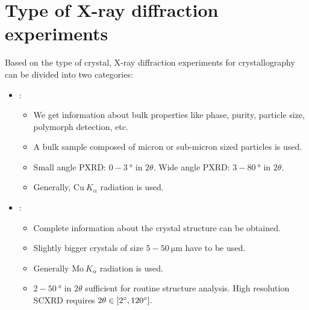 \section{Type of X-ray diffraction experiments}

Based on the type of crystal, X-ray diffraction experiments for crystallography can be divided into two categories:%
%	
	\begin{itemize}%
%	
	    \item {}:%
%	    	
	    	\begin{itemize}[label={$\rightarrowtail$}]%
%	    	
	    	    \item We get information about bulk properties like phase, purity, particle size, polymorph detection, etc.
	    	    
	    	    \item A bulk sample composed of micron or sub-micron sized particles is used.
	    	    
	    	    \item Small angle PXRD: $0-3~\si{\degree}$ in $2\theta.$ Wide angle PXRD: $3-80~\si{\degree}$ in $2\theta.$
	    	    
	    	    \item Generally, $\mathrm{Cu}~K_\alpha$ radiation is used.
	    	    
	    	\end{itemize}
	    	
	    \item {}:%
%	    	
	    	\begin{itemize}[label={$\rightarrowtail$}]%
%	    	
	    	    \item Complete information about the crystal structure can be obtained.
	    	    
	    	    \item Slightly bigger crystals of size $5-50~\si{\micro\metre}$ have to be used.
	    	    
	    	    \item Generally $\mathrm{Mo}~K_\alpha$ radiation is used.
	    	    
	    	    \item $2-50~\si{\degree}$ in $2\theta$ sufficient for routine structure analysis. High resolution SCXRD requires $2\theta \in \qty[ \SI{2}{\degree}, \SI{120}{\degree} ].$
	    	    
	    	\end{itemize}
	    
	\end{itemize}
	
